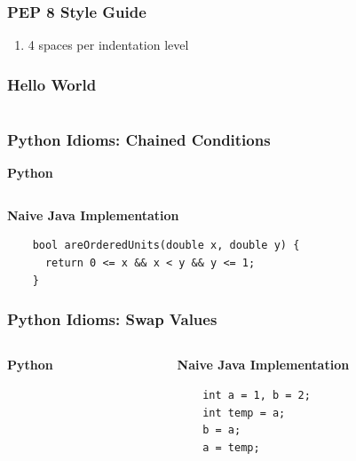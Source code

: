 \documentclass{beamer}
\begin{document}
  \begin{frame}
    \frametitle{PEP 8 Style Guide}
    \begin{enumerate}
      \item 4 spaces per indentation level
    \end{enumerate}
  \end{frame}

  \begin{frame}
    \frametitle{Hello World}
    \inputminted{python}{hello.py}
  \end{frame}

\begin{frame}[fragile]
  \frametitle{Python Idioms: Chained Conditions}
  \textbf{Python}
  \inputminted{python}{ordered_units.py}
  
  \textbf{Naive Java Implementation}
  \begin{lstlisting}
    bool areOrderedUnits(double x, double y) {
      return 0 <= x && x < y && y <= 1;
    }
  \end{lstlisting}
\end{frame}

    
\begin{frame}[fragile]
  \frametitle{Python Idioms: Swap Values}
  \begin{columns}
  \begin{column}{0.5\textwidth}
    \textbf{Python}
    \inputminted{python}{swap.py}
  \end{column}
  \begin{column}{0.5\textwidth}
  \textbf{Naive Java Implementation}
  \begin{lstlisting}
    int a = 1, b = 2;
    int temp = a;
    b = a;
    a = temp;
  \end{lstlisting}
  \end{column}
  \end{columns}
\end{frame}

%
\end{document}
